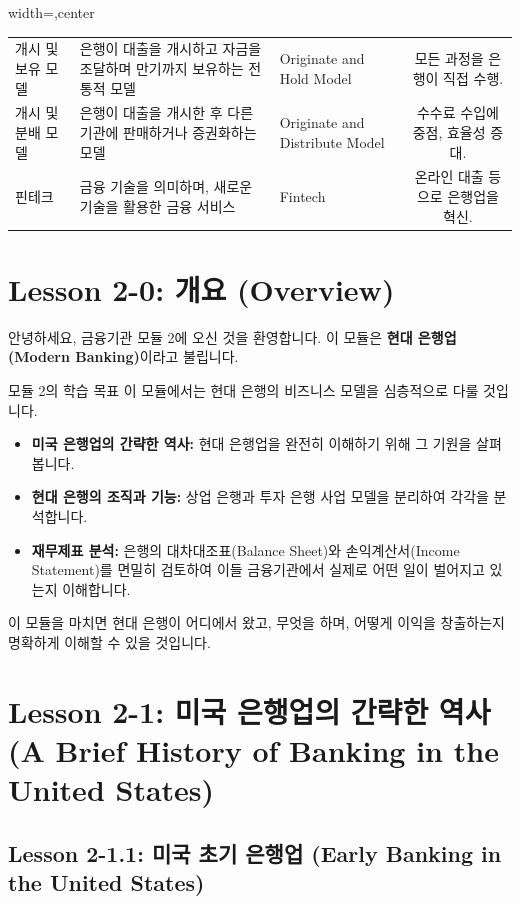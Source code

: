 \documentclass[11pt,a4paper]{article}
\begin{document}
\begin{adjustbox}{width=\textwidth,center}
\begin{tabular}{lllc}
개시 및 보유 모델 & 은행이 대출을 개시하고 자금을 조달하며 만기까지 보유하는 전통적 모델 & Originate and Hold Model & 모든 과정을 은행이 직접 수행. \\
개시 및 분배 모델 & 은행이 대출을 개시한 후 다른 기관에 판매하거나 증권화하는 모델 & Originate and Distribute Model & 수수료 수입에 중점, 효율성 증대. \\
핀테크 & 금융 기술을 의미하며, 새로운 기술을 활용한 금융 서비스 & Fintech & 온라인 대출 등으로 은행업을 혁신. \\
\bottomrule
\end{tabular}
\end{adjustbox}

\newpage
\section{Lesson 2-0: 개요 (Overview)}

안녕하세요, 금융기관 모듈 2에 오신 것을 환영합니다. 이 모듈은 \textbf{현대 은행업(Modern Banking)}이라고 불립니다.

\begin{summarybox}{모듈 2의 학습 목표}
이 모듈에서는 현대 은행의 비즈니스 모델을 심층적으로 다룰 것입니다.
\begin{itemize}
    \item \textbf{미국 은행업의 간략한 역사:} 현대 은행업을 완전히 이해하기 위해 그 기원을 살펴봅니다.
    \item \textbf{현대 은행의 조직과 기능:} 상업 은행과 투자 은행 사업 모델을 분리하여 각각을 분석합니다.
    \item \textbf{재무제표 분석:} 은행의 대차대조표(Balance Sheet)와 손익계산서(Income Statement)를 면밀히 검토하여 이들 금융기관에서 실제로 어떤 일이 벌어지고 있는지 이해합니다.
\end{itemize}
이 모듈을 마치면 현대 은행이 어디에서 왔고, 무엇을 하며, 어떻게 이익을 창출하는지 명확하게 이해할 수 있을 것입니다.
\end{summarybox}

\newpage
\section{Lesson 2-1: 미국 은행업의 간략한 역사 (A Brief History of Banking in the United States)}

\subsection{Lesson 2-1.1: 미국 초기 은행업 (Early Banking in the United States)}
\end{document}
